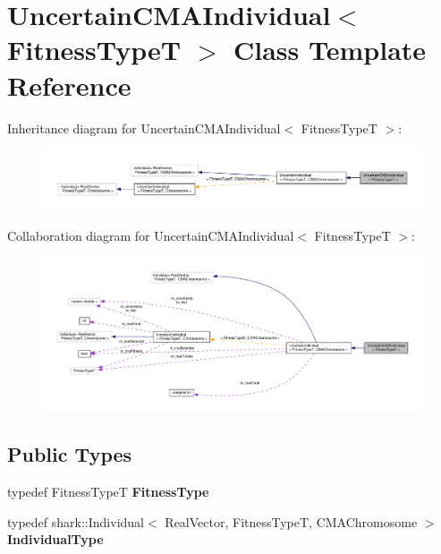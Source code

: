 \hypertarget{classUncertainCMAIndividual}{}\section{Uncertain\+C\+M\+A\+Individual$<$ Fitness\+TypeT $>$ Class Template Reference}
\label{classUncertainCMAIndividual}


Inheritance diagram for Uncertain\+C\+M\+A\+Individual$<$ Fitness\+TypeT $>$\+:\nopagebreak
\begin{figure}[H]
\begin{center}
\leavevmode
\includegraphics[width=350pt]{classUncertainCMAIndividual__inherit__graph}
\end{center}
\end{figure}


Collaboration diagram for Uncertain\+C\+M\+A\+Individual$<$ Fitness\+TypeT $>$\+:\nopagebreak
\begin{figure}[H]
\begin{center}
\leavevmode
\includegraphics[width=350pt]{classUncertainCMAIndividual__coll__graph}
\end{center}
\end{figure}
\subsection*{Public Types}
\begin{DoxyCompactItemize}
\item 
typedef Fitness\+TypeT {\bfseries Fitness\+Type}\hypertarget{classUncertainCMAIndividual_a71c60c81a92aeb97a5f4bace24d6901a}{}\label{classUncertainCMAIndividual_a71c60c81a92aeb97a5f4bace24d6901a}

\item 
typedef shark\+::\+Individual$<$ Real\+Vector, Fitness\+TypeT, C\+M\+A\+Chromosome $>$ {\bfseries Individual\+Type}\hypertarget{classUncertainIndividual_a12fd86b7482c1ea80ae0498388342e42}{}\label{classUncertainIndividual_a12fd86b7482c1ea80ae0498388342e42}

\end{DoxyCompactItemize}
